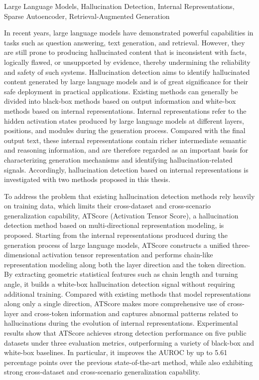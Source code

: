 \begin{englishabstract}{Large Language Models, Hallucination Detection, Internal Representations, Sparse Autoencoder, Retrieval-Augmented Generation}

In recent years, large language models have demonstrated powerful capabilities in tasks such as question answering, text generation, and retrieval. However, they are still prone to producing hallucinated content that is inconsistent with facts, logically flawed, or unsupported by evidence, thereby undermining the reliability and safety of such systems. Hallucination detection aims to identify hallucinated content generated by large language models and is of great significance for their safe deployment in practical applications. Existing methods can generally be divided into black-box methods based on output information and white-box methods based on internal representations. Internal representations refer to the hidden activation states produced by large language models at different layers, positions, and modules during the generation process. Compared with the final output text, these internal representations contain richer intermediate semantic and reasoning information, and are therefore regarded as an important basis for characterizing generation mechanisms and identifying hallucination-related signals. Accordingly, hallucination detection based on internal representations is investigated with two methods proposed in this thesis.

To address the problem that existing hallucination detection methods rely heavily on training data, which limits their cross-dataset and cross-scenario generalization capability, ATScore (Activation Tensor Score), a hallucination detection method based on multi-directional representation modeling, is proposed. Starting from the internal representations produced during the generation process of large language models, ATScore constructs a unified three-dimensional activation tensor representation and performs chain-like representation modeling along both the layer direction and the token direction. By extracting geometric statistical features such as chain length and turning angle, it builds a white-box hallucination detection signal without requiring additional training. Compared with existing methods that model representations along only a single direction, ATScore makes more comprehensive use of cross-layer and cross-token information and captures abnormal patterns related to hallucinations during the evolution of internal representations. Experimental results show that ATScore achieves strong detection performance on five public datasets under three evaluation metrics, outperforming a variety of black-box and white-box baselines. In particular, it improves the AUROC by up to 5.61 percentage points over the previous state-of-the-art method, while also exhibiting strong cross-dataset and cross-scenario generalization capability.


\end{englishabstract}

